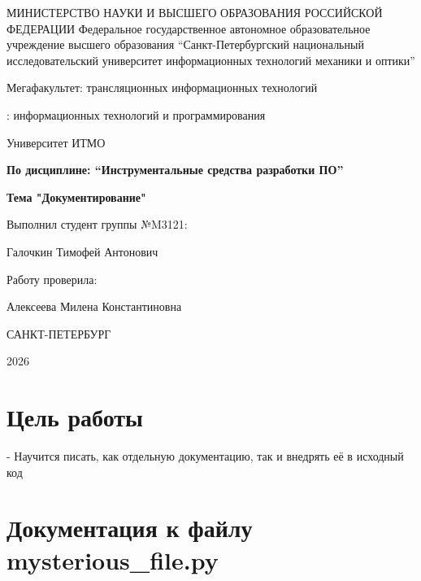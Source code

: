 \documentclass{article}
\begin{document}
\begin{titlepage}
    \centering
    \vspace*{2cm}
    
    {\Large МИНИСТЕРСТВО НАУКИ И ВЫСШЕГО ОБРАЗОВАНИЯ РОССИЙСКОЙ ФЕДЕРАЦИИ
Федеральное государственное автономное образовательное учреждение высшего образования
“Санкт-Петербургский национальный исследовательский университет информационных технологий механики и оптики”
    \par}
    {\Large Мегафакультет: трансляционных информационных технологий
    \par}
    {: информационных технологий и программирования
    \par}
    \vspace{0.5cm}
    {\large Университет ИТМО\par}
    
    \vspace{1.5cm}
    {\Large\bfseries По дисциплине: “Инструментальные средства разработки ПО”
    \par}
    {\Large\bfseries Тема "Документирование"
    \par}
    
    \vspace{0.5cm}
    
    \vfill
    {\large Выполнил студент группы №M3121:\par}
    {\large Галочкин Тимофей Антонович\par}
    \vspace{0.5cm}
    {\large Работу проверила:\par}
    {\large Алексеева Милена Константиновна\par}
    \vspace{1.05cm}
    {\Large САНКТ-ПЕТЕРБУРГ\par}
    {\large 2026\par}
\end{titlepage}

\section{Цель работы}
    {\large - Научится писать, как отдельную документацию, так и внедрять её в исходный код\par}

\section{Документация к файлу mysterious\_file.py}
    
\end{document}

